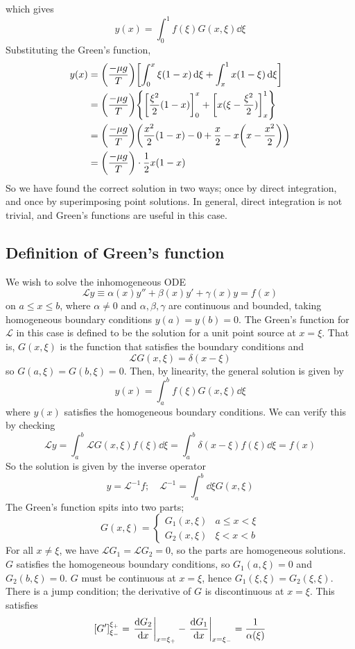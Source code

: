 which gives
\[
	y(x) = \int_0^1 f(\xi) G(x,\xi) \dd{\xi}
\]
Substituting the Green's function,
\begin{align*}
	y(x) & = \qty(\frac{-\mu g}{T}) \qty[ \int_0^x \xi(1-x) \dd{\xi} + \int_x^1 x(1-\xi) \dd{\xi}]              \\
	     & = \qty(\frac{-\mu g}{T}) \qty{ \qty[\frac{\xi^2}{2}(1-x)]_0^x + \qty[x(\xi - \frac{\xi^2}{2})]_x^1 } \\
	     & = \qty(\frac{-\mu g}{T}) \qty(\frac{x^2}{2}(1-x) - 0 + \frac{x}{2} - x\qty(x-\frac{x^2}{2}))         \\
	     & = \qty(\frac{-\mu g}{T}) \cdot \frac{1}{2}x(1-x)
\end{align*}
So we have found the correct solution in two ways; once by direct integration, and once by superimposing point solutions.
In general, direct integration is not trivial, and Green's functions are useful in this case.

\subsection{Definition of Green's function}
We wish to solve the inhomogeneous ODE
\[
	\mathcal L y \equiv \alpha(x) y'' + \beta(x) y' + \gamma(x) y = f(x)
\]
on \( a \leq x \leq b \), where \( \alpha \neq 0 \) and \( \alpha, \beta, \gamma \) are continuous and bounded, taking homogeneous boundary conditions \( y(a) = y(b) = 0 \).
The Green's function for \( \mathcal L \) in this case is defined to be the solution for a unit point source at \( x = \xi \).
That is, \( G(x,\xi) \) is the function that satisfies the boundary conditions and
\[
	\mathcal L G(x,\xi) = \delta(x-\xi)
\]
so \( G(a,\xi) = G(b,\xi) = 0 \).
Then, by linearity, the general solution is given by
\[
	y(x) = \int_a^b f(\xi) G(x,\xi) \dd{\xi}
\]
where \( y(x) \) satisfies the homogeneous boundary conditions.
We can verify this by checking
\[
	\mathcal L y = \int_a^b \mathcal L G(x,\xi) f(\xi) \dd{\xi} = \int_a^b \delta(x-\xi) f(\xi) \dd{\xi} = f(x)
\]
So the solution is given by the inverse operator
\[
	y = \mathcal L^{-1} f;\quad \mathcal L^{-1} = \int_a^b \dd{\xi} G(x,\xi)
\]
The Green's function spits into two parts;
\[
	G(x,\xi) = \begin{cases}
		G_1(x,\xi) & a \leq x < \xi \\
		G_2(x,\xi) & \xi < x < b
	\end{cases}
\]
For all \( x \neq \xi \), we have \( \mathcal L G_1 = \mathcal L G_2 = 0 \), so the parts are homogeneous solutions.
\( G \) satisfies the homogeneous boundary conditions, so \( G_1(a, \xi) = 0 \) and \( G_2(b, \xi) = 0 \).
\( G \) must be continuous at \( x = \xi \), hence \( G_1(\xi, \xi) = G_2(\xi, \xi) \).
There is a jump condition; the derivative of \( G \) is discontinuous at \( x = \xi \).
This satisfies
\[
	[G']_{\xi_-}^{\xi_+} = \eval{\dv{G_2}{x}}_{x = \xi_+} - \eval{\dv{G_1}{x}}_{x = \xi_-} = \frac{1}{\alpha(\xi)}
\]

